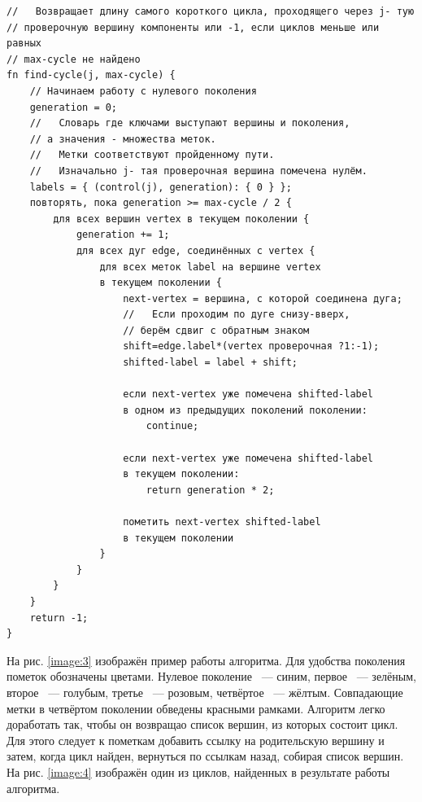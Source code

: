 \documentclass[14pt]{mmcs_article}
\begin{document}
\begin{lstlisting}[caption={Алгоритм поиска циклов}, label=lst:1]
//   Возвращает длину самого короткого цикла, проходящего через j- тую
// проверочную вершину компоненты или -1, если циклов меньше или равных
// max-cycle не найдено
fn find-cycle(j, max-cycle) {
    // Начинаем работу с нулевого поколения
    generation = 0;
    //   Словарь где ключами выступают вершины и поколения,
    // а значения - множества меток.
    //   Метки соответствуют пройденному пути.
    //   Изначально j- тая проверочная вершина помечена нулём.
    labels = { (control(j), generation): { 0 } };
    повторять, пока generation >= max-cycle / 2 { 
        для всех вершин vertex в текущем поколении {
            generation += 1;
            для всех дуг edge, соединённых с vertex {
                для всех меток label на вершине vertex
                в текущем поколении {
                    next-vertex = вершина, с которой соединена дуга;
                    //   Если проходим по дуге снизу-вверх,
                    // берём сдвиг с обратным знаком
                    shift=edge.label*(vertex проверочная ?1:-1);
                    shifted-label = label + shift;

                    если next-vertex уже помечена shifted-label
                    в одном из предыдущих поколений поколении:
                        continue;

                    если next-vertex уже помечена shifted-label 
                    в текущем поколении:
                        return generation * 2;

                    пометить next-vertex shifted-label
                    в текущем поколении
                }
            }
        }
    }
    return -1;
}
\end{lstlisting}

На рис. \ref{image:3} изображён пример работы алгоритма. Для удобства поколения пометок обозначены цветами. Нулевое поколение ~--- синим, первое ~--- зелёным, второе ~--- голубым, третье ~--- розовым, четвёртое ~--- жёлтым. Совпадающие метки в четвёртом поколении обведены красными рамками. Алгоритм легко доработать так, чтобы он возвращао список вершин, из которых состоит цикл. Для этого следует к пометкам добавить ссылку на родительскую вершину и затем, когда цикл найден, вернуться по ссылкам назад, собирая список вершин. На рис. \ref{image:4} изображён один из циклов, найденных в результате работы алгоритма. 
\end{document}
